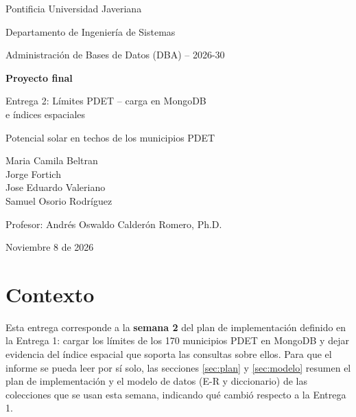 \documentclass[11pt,a4paper]{article}
\begin{document}
\begin{titlepage}
  \centering
  {\large Pontificia Universidad Javeriana\par}
  {\large Departamento de Ingeniería de Sistemas\par}
  \vspace{0.8cm}
  {\large Administración de Bases de Datos (DBA) -- 2026-30\par}
  \vspace{2.5cm}
  {\Huge\bfseries Proyecto final\par}
  \vspace{1cm}
  {\LARGE Entrega 2: Límites PDET -- carga en MongoDB\\ e índices espaciales\par}
  \vspace{1cm}
  {\large Potencial solar en techos de los municipios PDET\par}
  \vspace{3cm}
  {\large
    Maria Camila Beltran \\
    \vspace{0.5cm}
    Jorge Fortich \\
    \vspace{0.5cm}
    Jose Eduardo Valeriano \\
    \vspace{0.5cm}
    Samuel Osorio Rodríguez\par}
  \vspace{3cm}
  {\large Profesor: Andrés Oswaldo Calderón Romero, Ph.D.\par}
  \vspace{3cm}
  {\large {Noviembre 8 de 2026}\par}
\end{titlepage}

\tableofcontents
\newpage

\section{Contexto}
\label{sec:contexto}

Esta entrega corresponde a la \textbf{semana 2} del plan de implementación
definido en la Entrega 1: cargar los límites de los 170 municipios PDET en
MongoDB y dejar evidencia del índice espacial que soporta las consultas sobre
ellos. Para que el informe se pueda leer por sí solo, las secciones
\ref{sec:plan} y \ref{sec:modelo} resumen el plan de implementación y el modelo
de datos (E-R y diccionario) de las colecciones que se usan esta semana,
indicando qué cambió respecto a la Entrega 1.
\end{document}
